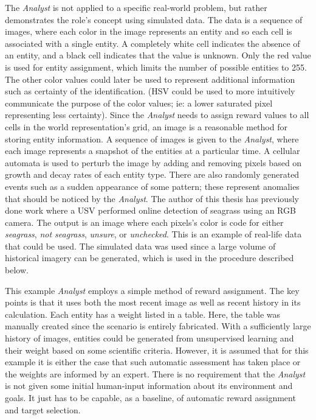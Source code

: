\documentclass{tamuccthesis}
\begin{document}
The \textit{Analyst} is not applied to a specific real-world problem, but rather demonstrates the role's concept using simulated data. The data is a sequence of images, where each color in the image represents an entity and so each cell is associated with a single entity. A completely white cell indicates the absence of an entity, and a black cell indicates that the value is unknown. Only the red value is used for entity assignment, which limits the number of possible entities to 255. The other color values could later be used to represent additional information such as certainty of the identification. (HSV could be used to more intuitively communicate the purpose of the color values; ie: a lower saturated pixel representing less certainty). Since the \textit{Analyst} needs to assign reward values to all cells in the world representation's grid, an image is a reasonable method for storing entity information. A sequence of images is given to the \textit{Analyst}, where each image represents a snapshot of the entities at a particular time. A cellular automata is used to perturb the image by adding and removing pixels based on growth and decay rates of each entity type. There are also randomly generated events such as a sudden appearance of some pattern; these represent anomalies that should be noticed by the \textit{Analyst}. The author of this thesis has previously done work where a USV performed online detection of seagrass using an RGB camera. The output is an image where each pixels's color is code for either \textit{seagrass}, \textit{not seagrass}, \textit{unsure}, or \textit{unchecked}. This is an example of real-life data that could be used. The simulated data was used since a large volume of historical imagery can be generated, which is used in the procedure described below. 

This example \textit{Analyst} employs a simple method of reward assignment. The key points is that it uses both the most recent image as well as recent history in its calculation. Each entity has a weight listed in a table. Here, the table was manually created since the scenario is entirely fabricated. With a sufficiently large history of images, entities could be generated from unsupervised learning and their weight based on some scientific criteria. However, it is assumed that for this example it is either the case that such automatic assessment has taken place or the weights are informed by an expert. There is no requirement that the \textit{Analyst} is not given some initial human-input information about its environment and goals. It just has to be capable, as a baseline, of automatic reward assignment and target selection. 
\end{document}
